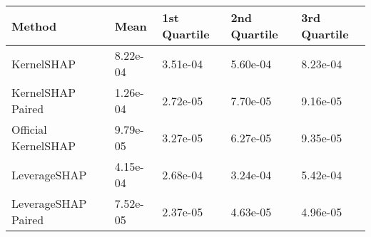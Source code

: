 \begin{tabular}{lllll}
  \toprule
  \textbf{Method} & \textbf{Mean} & \textbf{1st Quartile} & \textbf{2nd Quartile} & \textbf{3rd Quartile} \\ \midrule 
KernelSHAP & 8.22e-04 & 3.51e-04 & 5.60e-04 & 8.23e-04\\
KernelSHAP Paired & \cellcolor{bronze!60}1.26e-04 & \cellcolor{silver!60}2.72e-05 & \cellcolor{bronze!60}7.70e-05 & \cellcolor{silver!60}9.16e-05\\
Official KernelSHAP & \cellcolor{silver!60}9.79e-05 & \cellcolor{bronze!60}3.27e-05 & \cellcolor{silver!60}6.27e-05 & \cellcolor{bronze!60}9.35e-05\\
LeverageSHAP & 4.15e-04 & 2.68e-04 & 3.24e-04 & 5.42e-04\\
LeverageSHAP Paired & \cellcolor{gold!60}7.52e-05 & \cellcolor{gold!60}2.37e-05 & \cellcolor{gold!60}4.63e-05 & \cellcolor{gold!60}4.96e-05\\
\bottomrule
\end{tabular}
